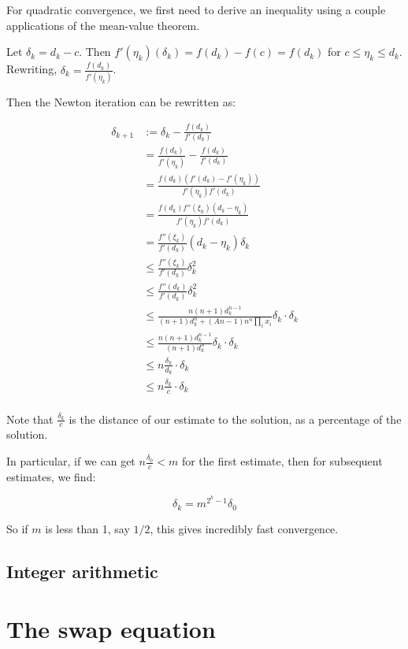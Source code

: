 \documentclass[
]{article}
\begin{document}
For quadratic convergence, we first need to derive an inequality using a
couple applications of the mean-value theorem.

Let \(\delta_k = d_k - c\). Then
\(f'(\eta_k) (\delta_k) = f(d_k) - f(c) = f(d_k)\) for
\(c\leq \eta_k \leq d_k\). Rewriting,
\(\delta_k = \frac{f(d_k)}{f'(\eta_k)}\).

Then the Newton iteration can be rewritten as:

\[\begin{aligned}
\delta_{k+1} &:= \delta_k - \frac{f(d_k)}{f'(d_k)} \\
&= \frac{f(d_k)}{f'(\eta_k)} - \frac{f(d_k)}{f'(d_k)} \\
&= \frac{ f(d_k) (f'(d_k) - f'(\eta_k)) }{f'(\eta_k) f'(d_k)} \\
&= \frac{ f(d_k) f''(\xi_k)(d_k - \eta_k)}{f'(\eta_k) f'(d_k)} \\
&= \frac{f''(\xi_k)}{f'(d_k)} (d_k - \eta_k) \delta_k\\
&\leq \frac{f''(\xi_k)}{f'(d_k)} \delta_k^2\\
&\leq \frac{f''(d_k)}{f'(d_k)} \delta_k^2\\
&\leq \frac{n (n+1) d_k^{n-1} }{(n+1) d_k^n + (An - 1) n^n \prod_i x_i  }\delta_k  \cdot \delta_k\\
&\leq \frac{n (n+1) d_k^{n-1} }{(n+1) d_k^n }\delta_k  \cdot \delta_k\\
&\leq n\frac{\delta_k}{d_k } \cdot \delta_k\\
&\leq n\frac{\delta_k}{c } \cdot \delta_k\\
\end{aligned}\]

Note that \(\frac{\delta_k}{c}\) is the distance of our estimate to the
solution, as a percentage of the solution.

In particular, if we can get \(n\frac{\delta_0}{c} < m\) for the first
estimate, then for subsequent estimates, we find:

\[ \delta_{k} = m^{2^k - 1} \delta_0\]

So if \(m\) is less than 1, say \(1/2\), this gives incredibly fast
convergence.

\hypertarget{integer-arithmetic}{%
\subsection{Integer arithmetic}\label{integer-arithmetic}}

\hypertarget{the-swap-equation}{%
\section{The swap equation}\label{the-swap-equation}}
\end{document}
